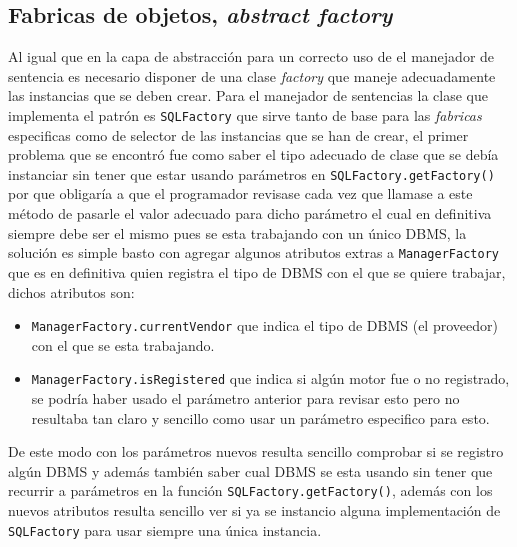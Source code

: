 \subsection{Fabricas de objetos, \textit{abstract factory}}
%
Al igual que en la capa de abstracción para un correcto uso de el manejador de sentencia es necesario disponer de una clase \textit{factory} que maneje adecuadamente las instancias que se deben crear. Para el manejador de sentencias la clase que implementa el patrón es \verb=SQLFactory= que sirve tanto de base para las \textit{fabricas} especificas como de selector de las instancias que se han de crear, el primer problema que se encontró fue como saber el tipo adecuado de clase que se debía instanciar sin tener que estar usando parámetros en \verb=SQLFactory.getFactory()= por que obligaría a que el programador revisase cada vez que llamase a este método de pasarle el valor adecuado para dicho parámetro el cual en definitiva siempre debe ser el mismo pues se esta trabajando con un único DBMS, la solución es simple basto con agregar algunos atributos extras a \verb=ManagerFactory= que es en definitiva quien registra el tipo de DBMS con el que se quiere trabajar, dichos atributos son:
%
\begin{itemize}
\item \verb=ManagerFactory.currentVendor= que indica el tipo de DBMS (el proveedor) con el que se esta trabajando.
\item \verb=ManagerFactory.isRegistered= que indica si algún motor fue o no registrado, se podría haber usado el parámetro anterior para revisar esto pero no resultaba tan claro y sencillo como usar un parámetro especifico para esto.
\end{itemize}
%
De este modo con los parámetros nuevos resulta sencillo comprobar si se registro algún DBMS y además también saber cual DBMS se esta usando sin tener que recurrir a parámetros en la función  \verb=SQLFactory.getFactory()=, además con los nuevos atributos resulta sencillo ver si ya se instancio alguna implementación de \verb=SQLFactory= para usar siempre una única instancia.

